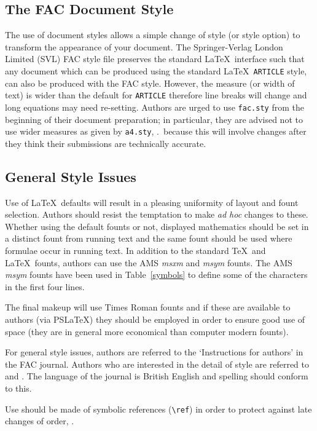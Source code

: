 \subsection{The FAC Document Style}

The use of document styles allows a simple change of style (or style
option) to transform the appearance of your document.
The Springer-Verlag London Limited (SVL) FAC style file preserves the
standard \LaTeX\ interface such that any document which can be produced
using the standard \LaTeX\ \verb"ARTICLE" style, can also be produced with
the FAC style.
However, the measure (or width of text) is wider than the default for
\verb"ARTICLE" therefore line breaks will change and long equations may
need re-setting.
Authors are urged to use \verb"fac.sty" from the beginning of their
document preparation; in particular, they are advised not to use wider
measures as given by \verb"a4.sty", \etc.\ because this will involve
changes after they think their submissions are technically accurate.

\subsection{General Style Issues}

Use of \LaTeX\ defaults will result in a pleasing uniformity of layout
and fount selection. Authors should resist the temptation to make
{\em ad hoc\/} changes to these.
Whether using the default founts or not, displayed mathematics should
be set in a distinct fount from running text and the same fount should
be used where formulae occur in running text.
In addition to the standard \TeX\ and \LaTeX\ founts, authors can use the
AMS {\em msxm\/} and {\em msym\/} founts.  The AMS {\em msym\/}
founts have been used in Table~\ref{symbols} to define some of the characters in the first four lines.

The final makeup will use Times Roman founts and if these are
available to authors (\eg via PSLaTeX) they should be employed in order
to ensure good use of space (they are in general more economical than
computer modern founts).

For general style issues, authors are referred to the `Instructions for
authors' in the FAC journal. Authors who are interested in the detail of style
are referred to \cite{But:Copy} and \cite{Chicago}. The language of the
journal is British English and spelling should conform to this.

Use should be made of symbolic references (\verb"\ref") in order to
protect against late changes of order, \etc.

